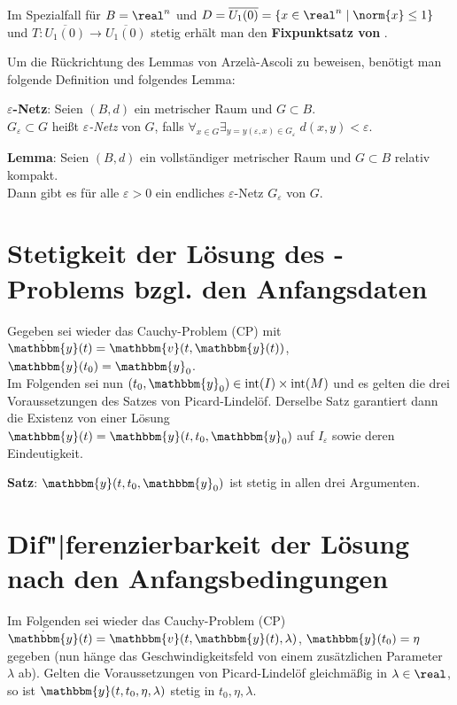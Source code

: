 Im Spezialfall für $B = \real^n$ und
$D = \overline{U_1(0)} = \{x \in \real^n \;|\; \norm{x} \le 1\}$
und $T\colon \overline{U_1(0)} \rightarrow \overline{U_1(0)}$ stetig
erhält man den \textbf{Fixpunktsatz von }.

\linie

Um die Rückrichtung des Lemmas von Arzelà-Ascoli zu beweisen, benötigt man
folgende Definition und folgendes Lemma:

\textbf{$\varepsilon$-Netz}:
Seien $(B, d)$ ein metrischer Raum und $G \subset B$. \\
$G_\varepsilon \subset G$ heißt \emph{$\varepsilon$-Netz} von $G$, falls
$\forall_{x \in G} \exists_{y = y(\varepsilon, x) \in G_\varepsilon}\;
d(x, y) < \varepsilon$.

\textbf{Lemma}:
Seien $(B, d)$ ein vollständiger metrischer Raum und $G \subset B$
relativ kompakt. \\
Dann gibt es für alle $\varepsilon > 0$ ein endliches $\varepsilon$-Netz
$G_\varepsilon$ von $G$.

\pagebreak

\section{%
    Stetigkeit der Lösung des -Problems bzgl. den Anfangsdaten%
}

Gegeben sei wieder das Cauchy-Problem (CP) mit
$\dot{\mathbbm{y}}(t) = \mathbbm{v}(t, \mathbbm{y}(t))$,
$\mathbbm{y}(t_0) = \mathbbm{y}_0$. \\
Im Folgenden sei nun $(t_0, \mathbbm{y}_0) \in \inneres(I) \times \inneres(M)$
und es gelten die drei Voraussetzungen des Satzes von Picard-Lindelöf.
Derselbe Satz garantiert dann die Existenz von einer Lösung \\
$\mathbbm{y}(t) = \mathbbm{y}(t, t_0, \mathbbm{y}_0)$ auf $I_\varepsilon$
sowie deren Eindeutigkeit.

\textbf{Satz}:
$\mathbbm{y}(t, t_0, \mathbbm{y}_0)$ ist stetig in allen drei Argumenten.

\section{%
    Dif"|ferenzierbarkeit der Lösung nach den Anfangsbedingungen%
}

Im Folgenden sei wieder das Cauchy-Problem (CP)
$\dot{\mathbbm{y}}(t) = \mathbbm{v}(t, \mathbbm{y}(t), \lambda)$,
$\mathbbm{y}(t_0) = \eta$
gegeben (nun hänge das Geschwindigkeitsfeld von einem zusätzlichen Parameter
$\lambda$ ab).
Gelten die Voraussetzungen von Picard-Lindelöf gleichmäßig in
$\lambda \in \real$, so ist $\mathbbm{y}(t, t_0, \eta, \lambda)$ stetig
in $t_0, \eta, \lambda$.

